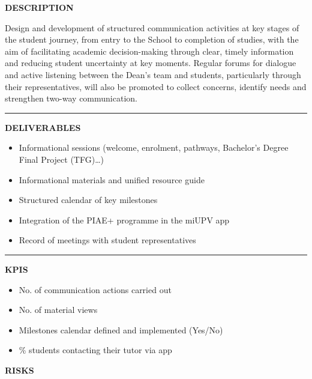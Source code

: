 \documentclass[11pt,a4paper]{scrreprt}
\newcommand{\fieldlabel}[1]{%
  {\footnotesize\sffamily\bfseries\color{mutedcolor}\MakeUppercase{#1}}\par\nopagebreak[4]
}
\newcommand{\fieldsep}{\vspace{3pt}\noindent\textcolor{bordercolor}{\rule{\linewidth}{0.4pt}}\vspace{3pt}\par}
\begin{document}
\vspace{8pt}

\begin{tcolorbox}[pabox={e360color}{A.P.1.2 \enspace\textbullet\enspace Development of Communication Actions at Key Moments of the Student Journey}]

\fieldlabel{Description}
{\small Design and development of structured communication activities at key stages of the student journey, from entry to the School to completion of studies, with the aim of facilitating academic decision-making through clear, timely information and reducing student uncertainty at key moments. Regular forums for dialogue and active listening between the Dean's team and students, particularly through their representatives, will also be promoted to collect concerns, identify needs and strengthen two-way communication.}\par
\fieldsep
\fieldlabel{Deliverables}
{\small \begin{itemize}[noitemsep,topsep=2pt]
\item Informational sessions (welcome, enrolment, pathways, Bachelor's Degree Final Project (TFG)…)
\item Informational materials and unified resource guide
\item Structured calendar of key milestones
\item Integration of the PIAE+ programme in the miUPV app
\item Record of meetings with student representatives
\end{itemize}}\par
\fieldsep
\fieldlabel{KPIs}
{\small \begin{itemize}[noitemsep,topsep=2pt]
\item No. of communication actions carried out
\item No. of material views
\item Milestones calendar defined and implemented (Yes/No)
\item \% students contacting their tutor via app
\end{itemize}}\par
\end{tcolorbox}
\begin{tcolorbox}[riskbox]
{\footnotesize\sffamily\bfseries\color{red!50!black} RISKS}\par{}
\end{tcolorbox}
\end{document}
